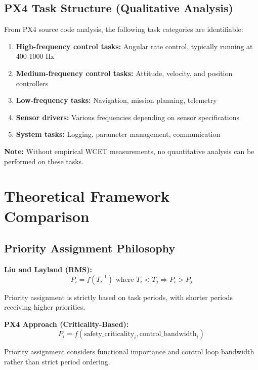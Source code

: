\documentclass[12pt,a4paper]{article}
\begin{document}
\subsection{PX4 Task Structure (Qualitative Analysis)}

From PX4 source code analysis, the following task categories are identifiable:

\begin{enumerate}
\item \textbf{High-frequency control tasks:} Angular rate control, typically running at 400-1000 Hz
\item \textbf{Medium-frequency control tasks:} Attitude, velocity, and position controllers
\item \textbf{Low-frequency tasks:} Navigation, mission planning, telemetry
\item \textbf{Sensor drivers:} Various frequencies depending on sensor specifications
\item \textbf{System tasks:} Logging, parameter management, communication
\end{enumerate}

\textbf{Note:} Without empirical WCET measurements, no quantitative analysis can be performed on these tasks.

\section{Theoretical Framework Comparison}

\subsection{Priority Assignment Philosophy}

\textbf{Liu and Layland (RMS):}
\begin{equation}
P_i = f(T_i^{-1}) \text{ where } T_i < T_j \Rightarrow P_i > P_j
\end{equation}

Priority assignment is strictly based on task periods, with shorter periods receiving higher priorities.

\textbf{PX4 Approach (Criticality-Based):}
\begin{equation}
P_i = f(\text{safety\_criticality}_i, \text{control\_bandwidth}_i)
\end{equation}

Priority assignment considers functional importance and control loop bandwidth rather than strict period ordering.
\end{document}
